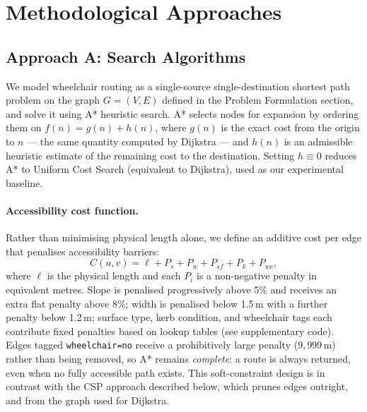 \documentclass[letterpaper]{article} %
\begin{document}
\section{Methodological Approaches}

\subsection{Approach A: Search Algorithms}
We model wheelchair routing as a single-source single-destination
shortest path problem on the graph $G = (V, E)$
defined in the Problem Formulation section, and solve it using A* heuristic search.
A* selects nodes for expansion by ordering them on
$f(n) = g(n) + h(n)$, where $g(n)$ is the exact cost from
the origin to $n$ — the same quantity computed by Dijkstra —
and $h(n)$ is an admissible heuristic estimate of the remaining
cost to the destination.
Setting $h \equiv 0$ reduces A* to Uniform Cost Search
(equivalent to Dijkstra), used as our experimental baseline.

\paragraph{Accessibility cost function.}
Rather than minimising physical length alone, we define an
additive cost per edge that penalises accessibility barriers:
%
\begin{equation}
  C(u,v) = \ell + P_s + P_w + P_{sf} + P_k + P_{wc},
  \label{eq:astar-cost}
\end{equation}
%
where $\ell$ is the physical length and each $P_i$ is a
non-negative penalty in equivalent metres.
Slope is penalised progressively above 5\% and receives an
extra flat penalty above 8\%; width is penalised below 1.5\,m
with a further penalty below 1.2\,m; surface type, kerb
condition, and wheelchair tags each contribute fixed penalties
based on lookup tables (see supplementary code).
Edges tagged \texttt{wheelchair=no} receive a prohibitively
large penalty ($9{,}999$\,m) rather than being removed,
so A* remains \emph{complete}: a route is always returned,
even when no fully accessible path exists.
This soft-constraint design is in
contrast with the CSP approach described below, which prunes edges
outright, and from the graph used for Dijkstra.
\end{document}
